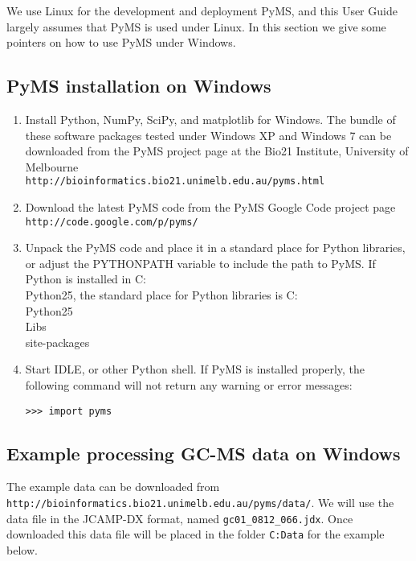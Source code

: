 We use Linux for the development and deployment PyMS, and this User
Guide largely assumes that PyMS is used under Linux. In this section
we give some pointers on how to use PyMS under Windows.

\subsection{PyMS installation on Windows}

\begin{enumerate}

\item Install Python, NumPy, SciPy, and matplotlib for Windows.
The bundle of these software packages tested under Windows XP and
Windows 7 can be downloaded from the PyMS project page at the
Bio21 Institute, University of Melbourne\\
{\tt http://bioinformatics.bio21.unimelb.edu.au/pyms.html}

\item Download the latest PyMS code from the PyMS Google Code
project page\\
{\tt http://code.google.com/p/pyms/}

\item Unpack the PyMS code and place it in a standard place for
Python libraries, or adjust the PYTHONPATH variable to include
the path to PyMS. If Python is installed in C:\\Python25, the
standard place for Python libraries is C:\\Python25\\Libs\\site-packages

\item Start IDLE, or other Python shell. If PyMS is installed
properly, the following command will not return any warning or
error messages:

\begin{verbatim}
>>> import pyms
\end{verbatim}

\end{enumerate}

\subsection{Example processing GC-MS data on Windows}

The example data can be downloaded from\\
{\tt http://bioinformatics.bio21.unimelb.edu.au/pyms/data/}.
We will use the data file in the JCAMP-DX format, named
{\tt gc01\_0812\_066.jdx}. Once downloaded this data file
will be placed in the folder {\tt C:Data} for the example
below.

